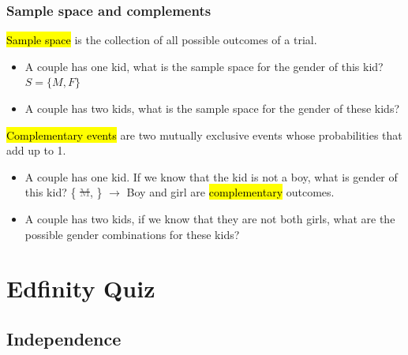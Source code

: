 \documentclass[11pt,containsverbatim,handout]{beamer}
\newcommand{\soln}[1]{ }
\begin{document}
\begin{frame}
\frametitle{Sample space and complements}

\hl{Sample space} is the collection of all possible outcomes of a trial.

\begin{itemize}
\item A couple has one kid, what is the sample space for the gender of this kid? $S = \{ M, F \}$
\item A couple has two kids, what is the sample space for the gender of these kids? \soln{\pause{$S = \{ MM, FF, FM, MF \}$}}
\end{itemize}

\pause

\hl{Complementary events} are two mutually exclusive events whose probabilities that add up to 1.

\begin{itemize}
\item A couple has one kid. If we know that the kid is not a boy, what is gender of this kid?
\{ \sout{\textcolor{gray}{M}},  \} $\rightarrow$ Boy and girl are \hl{complementary} outcomes.
\item A couple has two kids, if we know that they are not both girls, what are the possible gender combinations for these kids?
\soln{\pause{\{ \orange{MM}, \sout{\textcolor{gray}{FF}}, \orange{FM}, \orange{MF} \} }}
\end{itemize}

\end{frame}


\section{Edfinity Quiz}


\subsection{Independence}

\end{document}
